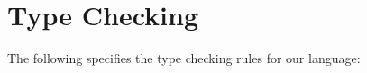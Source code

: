 \section{Type Checking}
The following specifies the type checking rules for our language:\\[5.0mm]
\ottdefnss